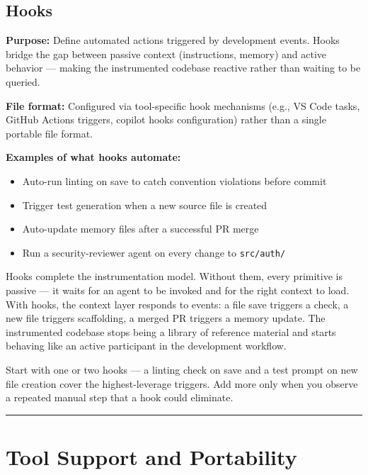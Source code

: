 \documentclass[
  a4paper,
  DIV=11,
  numbers=noendperiod]{scrreprt}
\providecommand{\tightlist}{%
  \setlength{\itemsep}{0pt}\setlength{\parskip}{0pt}}
\begin{document}
\subsection{Hooks}\label{hooks}

\textbf{Purpose:} Define automated actions triggered by development
events. Hooks bridge the gap between passive context (instructions,
memory) and active behavior --- making the instrumented codebase
reactive rather than waiting to be queried.

\textbf{File format:} Configured via tool-specific hook mechanisms
(e.g., VS Code tasks, GitHub Actions triggers, copilot hooks
configuration) rather than a single portable file format.

\textbf{Examples of what hooks automate:}

\begin{itemize}
\tightlist
\item
  Auto-run linting on save to catch convention violations before commit
\item
  Trigger test generation when a new source file is created
\item
  Auto-update memory files after a successful PR merge
\item
  Run a security-reviewer agent on every change to \texttt{src/auth/}
\end{itemize}

Hooks complete the instrumentation model. Without them, every primitive
is passive --- it waits for an agent to be invoked and for the right
context to load. With hooks, the context layer responds to events: a
file save triggers a check, a new file triggers scaffolding, a merged PR
triggers a memory update. The instrumented codebase stops being a
library of reference material and starts behaving like an active
participant in the development workflow.

Start with one or two hooks --- a linting check on save and a test
prompt on new file creation cover the highest-leverage triggers. Add
more only when you observe a repeated manual step that a hook could
eliminate.

\begin{center}\rule{0.5\linewidth}{0.5pt}\end{center}

\section{Tool Support and
Portability}\label{tool-support-and-portability}
\end{document}
